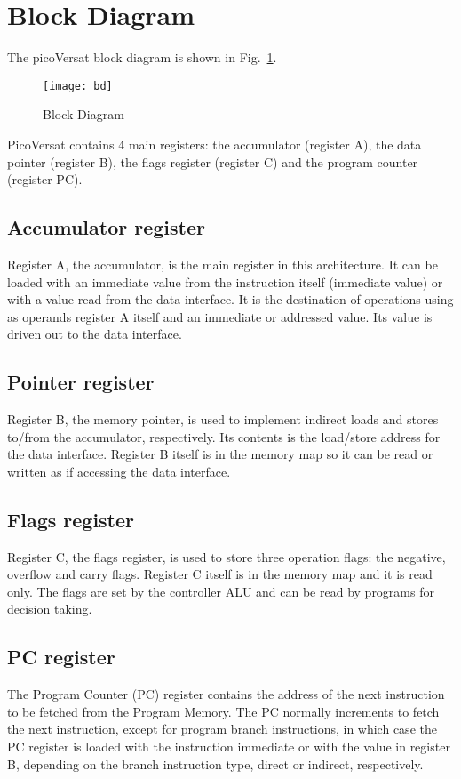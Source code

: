 \section{Block Diagram}

The picoVersat block diagram is shown in Fig.~\ref{fig:bd}.

\begin{figure}[!htbp]
    \centerline{\texttt{[image: bd]}}
    \vspace{0cm}\caption{Block Diagram}
    \label{fig:bd}
\end{figure}


PicoVersat contains 4 main registers: the accumulator (register A), the data
pointer (register B), the flags register (register C) and the program counter
(register PC).

\subsection{Accumulator register}

Register A, the accumulator, is the main register in this architecture. It can
be loaded with an immediate value from the instruction itself (immediate value)
or with a value read from the data interface. It is the destination of
operations using as operands register A itself and an immediate or addressed
value. Its value is driven out to the data interface.

\subsection{Pointer register}

Register B, the memory pointer, is used to implement indirect loads and
stores to/from the accumulator, respectively. Its contents is the
load/store address for the data interface. Register B itself is in the memory
map so it can be read or written as if accessing the data interface.

\subsection{Flags register}

Register C, the flags register, is used to store three operation flags: the
negative, overflow and carry flags. Register C itself is in the memory map and
it is read only. The flags are set by the controller ALU and can be read by
programs for decision taking.

\subsection{PC register}

The Program Counter (PC) register contains the address of the next instruction
to be fetched from the Program Memory. The PC normally increments to fetch the
next instruction, except for program branch instructions, in which case the PC
register is loaded with the instruction immediate or with the value in register
B, depending on the branch instruction type, direct or indirect, respectively.

